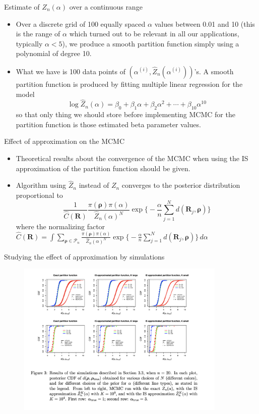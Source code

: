 \documentclass[11pt]{beamer}
\begin{document}
\begin{frame}{Estimate of $Z_n(\alpha)$ over a continuous range}
\begin{itemize}
    \item Over a discrete grid of 100 equally spaced $\alpha$ values between 0.01 and 10 (this is the range of $\alpha$ which turned out to be relevant in all our applications, typically $\alpha<5$), we produce a smooth partition function simply using a polynomial of degree 10.
    \item What we have is 100 data points of $(\alpha^{(i)}, \hat Z_n(\alpha^{(i)}))$'s. A smooth partition function is produced by fitting multiple linear regression for the model $$\log \hat Z_n(\alpha)=\beta_0+\beta_1 \alpha+\beta_2 \alpha^2+\cdots+\beta_{10} \alpha^{10}$$ so that only thing we should store before implementing MCMC for the partition function is those estimated beta parameter values.
\end{itemize}
\end{frame}

\begin{frame}{Effect of approximation on the MCMC}
\begin{itemize}
    \item Theoretical results about the convergence of the MCMC when using the IS approximation of the partition function should be given. 
    \item Algorithm using $\hat{Z}_n$ instead of $Z_n$ converges to the posterior distribution proportional to \begin{equation*} \frac{1}{\hat{C}(\mathbf{R})}\frac{\pi(\boldsymbol{\rho})\pi(\alpha)}{\hat{Z}_n(\alpha)^N} \exp \big\{-\frac{\alpha}{n}\sum_{j=1}^N d(\mathbf{R}_j, \boldsymbol{\rho})\big\} \end{equation*} where the normalizing factor $\hat{C}(\mathbf{R})=\int\sum_{\boldsymbol{\rho}\in \mathcal{P}_n}\frac{\pi(\boldsymbol{\rho})\pi(\alpha)}{\hat{Z}_n(\alpha)^N} \exp \big\{-\frac{\alpha}{n}\sum_{j=1}^N d(\mathbf{R}_j, \boldsymbol{\rho})\big\}\, d\alpha $
\end{itemize}
\end{frame}

\begin{frame}{Studying the effect of approximation by simulations}
    \begin{figure}
        \includegraphics[width=10cm]{VitelliFigure3.png}
    \end{figure}
\end{frame}
\end{document}
